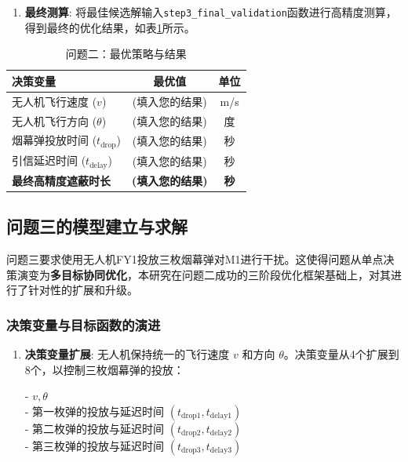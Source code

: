 \documentclass[12pt]{article}
\newcommand{\code}[1]{\texttt{#1}} %
\begin{document}
\begin{CJK}{UTF8}{gbsn}
\begin{enumerate}
			\item \textbf{最终测算}: 将最佳候选解输入\code{step3\_final\_validation}函数进行高精度测算，得到最终的优化结果，如表\ref{tab:results_q2}所示。
		\end{enumerate}
		
		\begin{table}[H]
			\centering
			\caption{问题二：最优策略与结果}
			\label{tab:results_q2}
			\begin{tabular}{@{}lcc@{}}
				\toprule
				决策变量               & 最优值      & 单位 \\ \midrule
				无人机飞行速度 ($v$)     & (填入您的结果) & m/s  \\
				无人机飞行方向 ($\theta$)    & (填入您的结果) & 度   \\
				烟幕弹投放时间 ($t_{\text{drop}}$) & (填入您的结果) & 秒   \\
				引信延迟时间 ($t_{\text{delay}}$)   & (填入您的结果) & 秒   \\ \midrule
				\textbf{最终高精度遮蔽时长} & \textbf{(填入您的结果)} & \textbf{秒}   \\ \bottomrule
			\end{tabular}
		\end{table}
		
		\subsection{问题三的模型建立与求解}
		
		问题三要求使用无人机FY1投放三枚烟幕弹对M1进行干扰。这使得问题从单点决策演变为\textbf{多目标协同优化}，本研究在问题二成功的三阶段优化框架基础上，对其进行了针对性的扩展和升级。
		
		\subsubsection{决策变量与目标函数的演进}
		
		\begin{enumerate}
			\item \textbf{决策变量扩展}: 无人机保持统一的飞行速度 $v$ 和方向 $\theta$。决策变量从4个扩展到8个，以控制三枚烟幕弹的投放：
			
			- $v, \theta$\\
			\indent - 第一枚弹的投放与延迟时间 $(t_{\text{drop1}}, t_{\text{delay1}})$\\
			\indent - 第二枚弹的投放与延迟时间 $(t_{\text{drop2}}, t_{\text{delay2}})$\\
			\indent - 第三枚弹的投放与延迟时间 $(t_{\text{drop3}}, t_{\text{delay3}})$
			

\end{enumerate}
\end{CJK}
\end{document}
